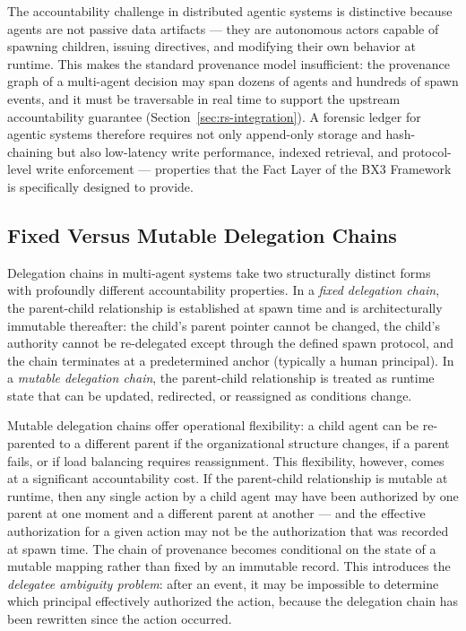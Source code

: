\documentclass[12pt]{article}
\begin{document}
The accountability challenge in distributed agentic systems is distinctive because agents are not passive data artifacts --- they are autonomous actors capable of spawning children, issuing directives, and modifying their own behavior at runtime. This makes the standard provenance model insufficient: the provenance graph of a multi-agent decision may span dozens of agents and hundreds of spawn events, and it must be traversable in real time to support the upstream accountability guarantee (Section~\ref{sec:rs-integration}). A forensic ledger for agentic systems therefore requires not only append-only storage and hash-chaining but also low-latency write performance, indexed retrieval, and protocol-level write enforcement --- properties that the Fact Layer of the BX3 Framework is specifically designed to provide.

\subsection{Fixed Versus Mutable Delegation Chains}

Delegation chains in multi-agent systems take two structurally distinct forms with profoundly different accountability properties. In a \emph{fixed delegation chain}, the parent-child relationship is established at spawn time and is architecturally immutable thereafter: the child's parent pointer cannot be changed, the child's authority cannot be re-delegated except through the defined spawn protocol, and the chain terminates at a predetermined anchor (typically a human principal). In a \emph{mutable delegation chain}, the parent-child relationship is treated as runtime state that can be updated, redirected, or reassigned as conditions change.

Mutable delegation chains offer operational flexibility: a child agent can be re-parented to a different parent if the organizational structure changes, if a parent fails, or if load balancing requires reassignment. This flexibility, however, comes at a significant accountability cost. If the parent-child relationship is mutable at runtime, then any single action by a child agent may have been authorized by one parent at one moment and a different parent at another --- and the effective authorization for a given action may not be the authorization that was recorded at spawn time. The chain of provenance becomes conditional on the state of a mutable mapping rather than fixed by an immutable record. This introduces the \emph{delegatee ambiguity problem}: after an event, it may be impossible to determine which principal effectively authorized the action, because the delegation chain has been rewritten since the action occurred.
\end{document}
